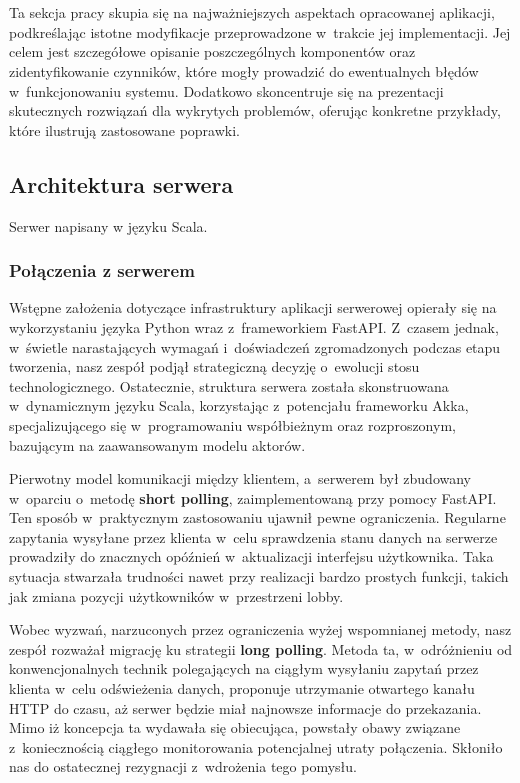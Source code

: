 \chapter{\ChapterTitleRealizationAspects}
\label{sec:wybrane-aspekty-realizacji}

Ta sekcja pracy skupia się na najważniejszych aspektach opracowanej
aplikacji, podkreślając istotne modyfikacje przeprowadzone w~trakcie
jej implementacji. Jej celem jest szczegółowe opisanie poszczególnych
komponentów oraz zidentyfikowanie czynników, które mogły prowadzić do
ewentualnych błędów w~funkcjonowaniu systemu. Dodatkowo skoncentruje
się na prezentacji skutecznych rozwiązań dla wykrytych problemów,
oferując konkretne przykłady, które ilustrują zastosowane poprawki.

\section{Architektura serwera}

Serwer napisany w języku Scala.

\subsection{Połączenia z serwerem}

Wstępne założenia dotyczące infrastruktury aplikacji
serwerowej opierały się na wykorzystaniu języka Python
wraz z~frameworkiem FastAPI. Z~czasem jednak, w~świetle
narastających wymagań i~doświadczeń zgromadzonych
podczas etapu tworzenia, nasz zespół podjął
strategiczną decyzję o~ewolucji stosu technologicznego.
Ostatecznie, struktura serwera została skonstruowana
w~dynamicznym języku Scala, korzystając z~potencjału
frameworku Akka, specjalizującego się w~programowaniu
współbieżnym oraz rozproszonym, bazującym na
zaawansowanym modelu aktorów.

Pierwotny model komunikacji między klientem, a~serwerem
był zbudowany w~oparciu o~metodę \textbf{short polling},
zaimplementowaną przy pomocy FastAPI. Ten sposób
w~praktycznym zastosowaniu ujawnił pewne ograniczenia.
Regularne zapytania wysyłane przez klienta w~celu
sprawdzenia stanu danych na serwerze prowadziły do
znacznych opóźnień w~aktualizacji interfejsu
użytkownika. Taka sytuacja stwarzała trudności nawet
przy realizacji bardzo prostych funkcji, takich jak
zmiana pozycji użytkowników w~przestrzeni lobby.

Wobec wyzwań, narzuconych przez ograniczenia wyżej wspomnianej metody, nasz
zespół rozważał migrację ku strategii \textbf{long polling}. Metoda ta,
w~odróżnieniu od konwencjonalnych technik polegających na ciągłym
wysyłaniu zapytań przez klienta w~celu odświeżenia danych, proponuje
utrzymanie otwartego kanału HTTP do czasu, aż serwer będzie miał
najnowsze informacje do przekazania. Mimo iż koncepcja ta wydawała się
obiecująca, powstały obawy związane z~koniecznością ciągłego monitorowania
potencjalnej utraty połączenia. Skłoniło nas do ostatecznej rezygnacji
z~wdrożenia tego pomysłu.

